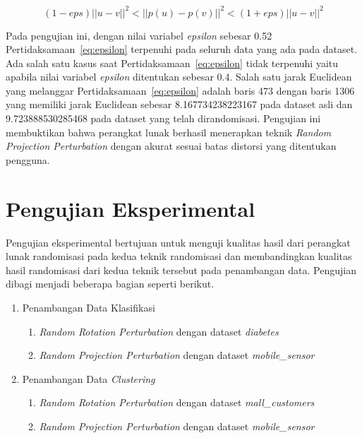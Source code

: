 \begin{equation}\label{eq:epsilon}
	(1-eps)||u - v||^{2}<||p(u) - p(v)||^{2}<(1+eps)||u - v||^{2}
\end{equation}

Pada pengujian ini, dengan nilai variabel \textit{epsilon} sebesar 0.52 Pertidaksamaan~\ref{eq:epsilon} terpenuhi pada seluruh data yang ada pada dataset. Ada salah satu kasus saat Pertidaksamaan~\ref{eq:epsilon} tidak terpenuhi yaitu apabila nilai variabel \textit{epsilon} ditentukan sebesar 0.4. Salah satu jarak Euclidean yang melanggar Pertidaksamaan~\ref{eq:epsilon} adalah baris 473 dengan baris 1306 yang memiliki jarak Euclidean sebesar 8.167734238223167 pada dataset asli dan 9.723888530285468 pada dataset yang telah dirandomisasi. Pengujian ini membuktikan bahwa perangkat lunak berhasil menerapkan teknik \textit{Random Projection Perturbation} dengan akurat sesuai batas distorsi yang ditentukan pengguna.

\section{Pengujian Eksperimental}
\label{sec:pengujianeksperimental}

Pengujian eksperimental bertujuan untuk menguji kualitas hasil dari perangkat lunak randomisasi pada kedua teknik randomisasi dan membandingkan kualitas hasil randomisasi dari kedua teknik tersebut pada penambangan data. Pengujian dibagi menjadi beberapa bagian seperti berikut.

\begin{enumerate}
	\item Penambangan Data Klasifikasi
	\begin{enumerate}
		\item \textit{Random Rotation Perturbation} dengan dataset \textit{diabetes}
		\item \textit{Random Projection Perturbation} dengan dataset \textit{mobile\_sensor}
	\end{enumerate}
	\item Penambangan Data \textit{Clustering}
	\begin{enumerate}
		\item \textit{Random Rotation Perturbation} dengan dataset \textit{mall\_customers}
		\item \textit{Random Projection Perturbation} dengan dataset \textit{mobile\_sensor}
	\end{enumerate}
\end{enumerate}

